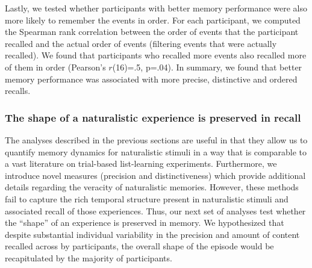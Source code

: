 \documentclass{article}
\begin{document}
{ Lastly, we tested whether participants with better memory performance were also more likely to remember the events in order.  For each participant, we computed the Spearman rank correlation between the order of events that the participant recalled and the actual order of events (filtering events that were actually recalled).  We found that participants who recalled more events also recalled more of them in order (Pearson's $r$(16)=.5, p=.04). In summary, we found that better memory performance was associated with more precise, distinctive and ordered recalls.

\subsubsection{The shape of a naturalistic experience is preserved in recall}
The analyses described in the previous sections are useful in that they allow us to quantify memory dynamics for naturalistic stimuli in a way that is comparable to a vast literature on trial-based list-learning experiments. Furthermore, we introduce novel measures (precision and distinctiveness) which provide additional details regarding the veracity of naturalistic memories. However, these methods fail to capture the rich temporal structure present in naturalistic stimuli and associated recall of those experiences. Thus, our next set of analyses test whether the ``shape'' of an experience is preserved in memory. We hypothesized that despite substantial individual variability in the precision and amount of content recalled across by participants, the overall shape of the episode would be recapitulated by the majority of participants.

}
\end{document}
